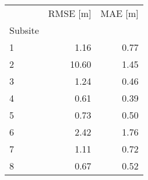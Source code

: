 \begin{tabular}{lrr}
\toprule
 & RMSE [m] & MAE [m] \\
Subsite &  &  \\
\midrule
1 & 1.16 & 0.77 \\
2 & 10.60 & 1.45 \\
3 & 1.24 & 0.46 \\
4 & 0.61 & 0.39 \\
5 & 0.73 & 0.50 \\
6 & 2.42 & 1.76 \\
7 & 1.11 & 0.72 \\
8 & 0.67 & 0.52 \\
\bottomrule
\end{tabular}
